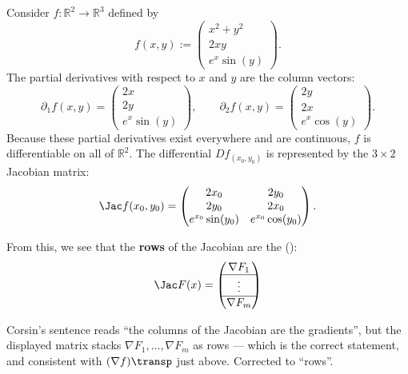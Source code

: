 \begin{example}
\label{ex:jacobian_vector_field}
Consider $f : \mathbb{R}^2 \to \mathbb{R}^3$ defined by
\[f(x,y) := \begin{pmatrix} x^2+y^2 \\ 2xy \\ e^x\sin(y) \end{pmatrix}.\]
The partial derivatives with respect to $x$ and $y$ are the column vectors:
\[\partial_1 f(x,y) = \begin{pmatrix} 2x \\ 2y \\ e^x\sin(y) \end{pmatrix}, \qquad \partial_2 f(x,y) = \begin{pmatrix} 2y \\ 2x \\ e^x\cos(y) \end{pmatrix}.\]
Because these partial derivatives exist everywhere and are continuous, $f$ is differentiable on all of $\mathbb{R}^2$. The differential $Df_{(x_0,y_0)}$ is represented by the $3 \times 2$ Jacobian matrix:
\[\Jac f(x_0,y_0) = \begin{pmatrix} 2x_0 & 2y_0 \\ 2y_0 & 2x_0 \\ e^{x_0}\sin(y_0) & e^{x_0}\cos(y_0) \end{pmatrix}.\]
\end{example}

From this, we see that the \textbf{rows} of the Jacobian are the 
():
\[\Jac F(x) = \begin{pmatrix} \nabla F_1 \\ \hline \vdots \\ \hline \nabla F_m \end{pmatrix}\]

\begin{ainote}
Corsin's sentence reads ``the columns of the Jacobian are the gradients'', but the displayed
matrix stacks $\nabla F_1, \dots, \nabla F_m$ as rows --- which is the correct statement, and
consistent with $(\nabla f)\transp$ just above. Corrected to ``rows''.
\end{ainote}

